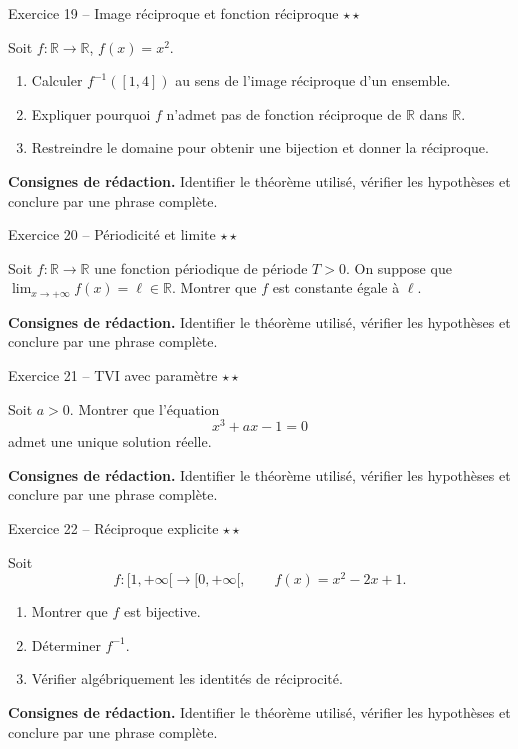 \documentclass[11pt,a4paper]{article}
\newcommand{\etoiles}[1]{\hfill\textcolor{orangeprepa}{\textbf{#1}}}
\newcommand{\R}{\mathbb{R}}
\begin{document}
\begin{exobox}{Exercice 19 -- Image réciproque et fonction réciproque \etoiles{$\star\star$}}

Soit $f:\R\to\R$, $f(x)=x^2$.
\begin{enumerate}
\item Calculer $f^{-1}([1,4])$ au sens de l'image réciproque d'un ensemble.
\item Expliquer pourquoi $f$ n'admet pas de fonction réciproque de $\R$ dans $\R$.
\item Restreindre le domaine pour obtenir une bijection et donner la réciproque.
\end{enumerate}

\medskip
\textbf{Consignes de rédaction.} Identifier le théorème utilisé, vérifier les hypothèses et conclure par une phrase complète.
\end{exobox}


\begin{exobox}{Exercice 20 -- Périodicité et limite \etoiles{$\star\star$}}

Soit $f:\R\to\R$ une fonction périodique de période $T>0$. On suppose que $\lim_{x\to+\infty}f(x)=\ell\in\R$. Montrer que $f$ est constante égale à $\ell$.

\medskip
\textbf{Consignes de rédaction.} Identifier le théorème utilisé, vérifier les hypothèses et conclure par une phrase complète.
\end{exobox}


\begin{exobox}{Exercice 21 -- TVI avec paramètre \etoiles{$\star\star$}}

Soit $a>0$. Montrer que l'équation
\[
x^3+ax-1=0
\]
admet une unique solution réelle.

\medskip
\textbf{Consignes de rédaction.} Identifier le théorème utilisé, vérifier les hypothèses et conclure par une phrase complète.
\end{exobox}


\begin{exobox}{Exercice 22 -- Réciproque explicite \etoiles{$\star\star$}}

Soit
\[
f:[1,+\infty[\to[0,+\infty[,\qquad f(x)=x^2-2x+1.
\]
\begin{enumerate}
\item Montrer que $f$ est bijective.
\item Déterminer $f^{-1}$.
\item Vérifier algébriquement les identités de réciprocité.
\end{enumerate}

\medskip
\textbf{Consignes de rédaction.} Identifier le théorème utilisé, vérifier les hypothèses et conclure par une phrase complète.
\end{exobox}
\end{document}
